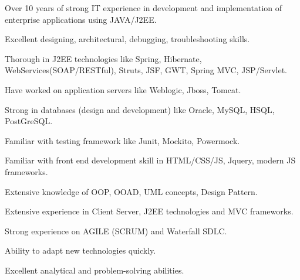%
%
%
\begin{description}[align=left]
\item Over 10 years of strong IT experience in development and implementation of enterprise applications using JAVA/J2EE.
\item Excellent designing, architectural, debugging, troubleshooting skills.
\item Thorough in J2EE technologies like Spring, Hibernate, WebServices(SOAP/RESTful), Struts, JSF, GWT, Spring MVC, JSP/Servlet.
\item Have worked on application servers like Weblogic, Jboss, Tomcat.
\item Strong in databases (design and development) like Oracle, MySQL, HSQL, PostGreSQL.
\item Familiar with testing framework like Junit, Mockito, Powermock.
\item Familiar with front end development skill in HTML/CSS/JS, Jquery, modern JS frameworks.
\item Extensive knowledge of OOP, OOAD, UML concepts, Design Pattern.
\item Extensive experience in Client Server, J2EE technologies and MVC frameworks.
\item Strong experience on AGILE (SCRUM) and Waterfall SDLC.
\item Ability to adapt new technologies quickly.
\item Excellent analytical and problem-solving abilities.
\end{description}